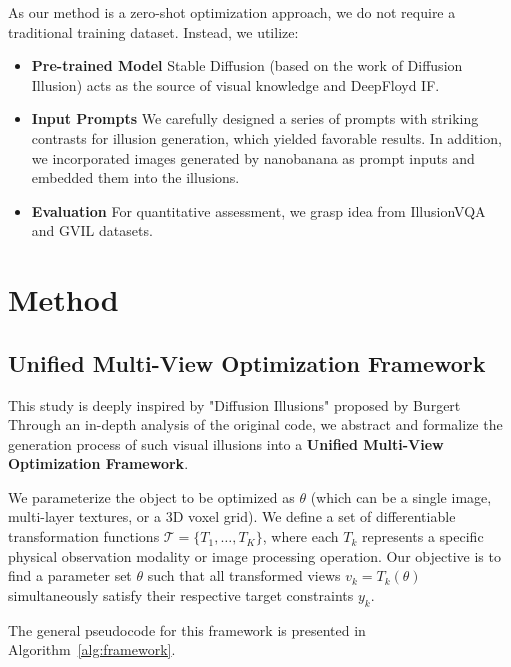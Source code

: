 \documentclass{article}
\begin{document}
As our method is a zero-shot optimization approach, we do not require a traditional training dataset. Instead, we utilize:
\begin{itemize}
    \item \textbf{Pre-trained Model} Stable Diffusion (based on the work of Diffusion Illusion\cite{10.1145/3641519.3657500}) acts as the source of visual knowledge and DeepFloyd IF.

    \item  \textbf{Input Prompts} We carefully designed a series of prompts with striking contrasts for illusion generation, which yielded favorable results. In addition, we incorporated images generated by nanobanana as prompt inputs and embedded them into the illusions.

    \item \textbf{Evaluation} For quantitative assessment, we grasp idea from IllusionVQA\cite{shahgir2024illusionvqa} and GVIL\cite{zhang2023grounding} datasets. 
\end{itemize}
 




\section{Method}
\label{sec:method}

\subsection{Unified Multi-View Optimization Framework}

This study is deeply inspired by "Diffusion Illusions" proposed by Burgert\cite{10.1145/3641519.3657500} Through an in-depth analysis of the original code, we abstract and formalize the generation process of such visual illusions into a \textbf{Unified Multi-View Optimization Framework}.

We parameterize the object to be optimized as $\theta$ (which can be a single image, multi-layer textures, or a 3D voxel grid). We define a set of differentiable transformation functions $\mathcal{T} = \{T_1, \dots, T_K\}$, where each $T_k$ represents a specific physical observation modality or image processing operation. Our objective is to find a parameter set $\theta$ such that all transformed views $v_k = T_k(\theta)$ simultaneously satisfy their respective target constraints $y_k$.

The general pseudocode for this framework is presented in Algorithm~\ref{alg:framework}.
\end{document}

